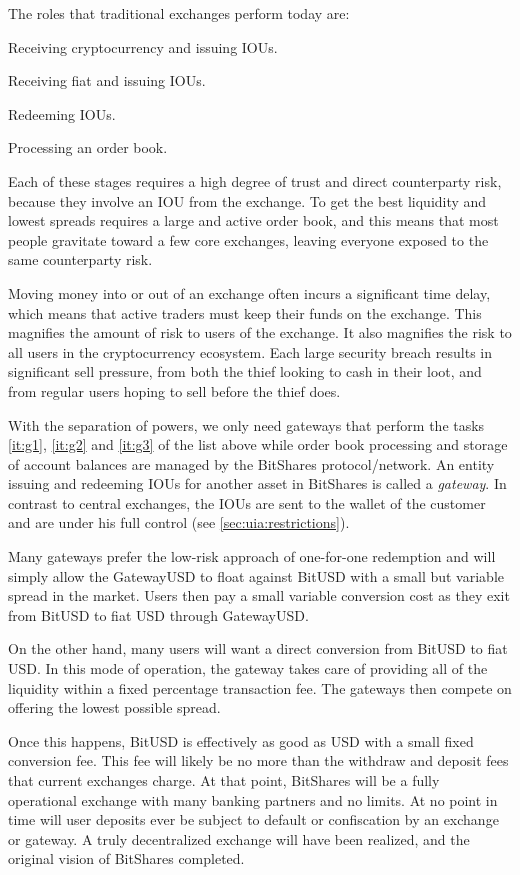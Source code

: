 \label{sec:gateway}

The roles that traditional exchanges perform today are:

\begin{compactenum}
 \item \label{it:g1} Receiving cryptocurrency and issuing IOUs.
 \item \label{it:g2} Receiving fiat and issuing IOUs.
 \item \label{it:g3} Redeeming IOUs.
 \item \label{it:g4} Processing an order book.
\end{compactenum}

Each of these stages requires a high degree of trust and direct counterparty
risk, because they involve an IOU from the exchange. To get the best
liquidity and lowest spreads requires a large and active order book, and this
means that most people gravitate toward a few core exchanges, leaving everyone
exposed to the same counterparty risk.

Moving money into or out of an exchange often incurs a significant time delay,
which means that active traders must keep their funds on the exchange. This
magnifies the amount of risk to users of the exchange. It also magnifies the
risk to all users in the cryptocurrency ecosystem. Each large security breach
results in significant sell pressure, from both the thief looking to cash in
their loot, and from regular users hoping to sell before the thief does.

\medskip

With the separation of powers, we only need gateways that perform the tasks
\ref{it:g1}, \ref{it:g2} and \ref{it:g3} of the list above while order book
processing and storage of account balances are managed by the BitShares
protocol/network. An entity issuing and redeeming IOUs for another asset in
BitShares is called a \emph{gateway}. In contrast to central exchanges, the
IOUs are sent to the wallet of the customer and are under his full control (see
\cref{sec:uia:restrictions}).

Many gateways prefer the low-risk approach of one-for-one redemption and will
simply allow the GatewayUSD to float against BitUSD with a small but variable
spread in the market. Users then pay a small variable conversion cost as they
exit from BitUSD to fiat USD through GatewayUSD.

On the other hand, many users will want a direct conversion from BitUSD to fiat
USD. In this mode of operation, the gateway takes care of providing all of the
liquidity within a fixed percentage transaction fee. The gateways then
compete on offering the lowest possible spread.

Once this happens, BitUSD is effectively as good as USD with a small fixed
conversion fee. This fee will likely be no more than the withdraw and deposit
fees that current exchanges charge. At that point, BitShares will be a fully
operational exchange with many banking partners and no limits. At no point in
time will user deposits ever be subject to default or confiscation by an
exchange or gateway. A truly decentralized exchange will have been realized,
and the original vision of BitShares completed.
